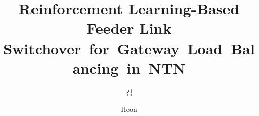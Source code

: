 \documentclass[master,english,final,binding]{classfile/cover_ajou-ucs-lsh}
\title[english]{\texorpdfstring{Reinforcement Learning-Based Feeder Link \mbox{Switchover for Gateway Load Balancing in NTN}}{Reinforcement Learning-Based Feeder Link Switchover for Gateway Load Balancing in NTN}}
\author[korean]{김}{민식}
\author[english]{Heon}{Minsik}
\begin{document}
\makefrontcover    %
\makeapproval      %
\end{document}

